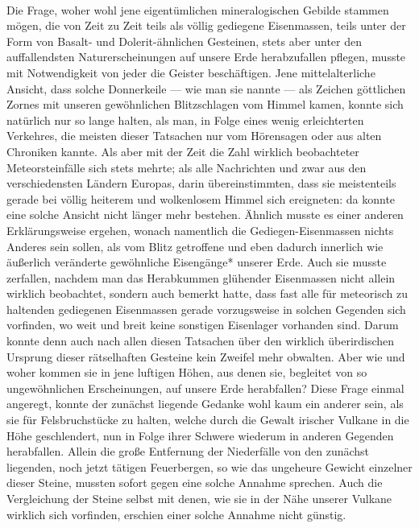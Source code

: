 \documentclass[a4paper, 8pt, oneside, polutonikogreek, german]{article}
\begin{document}
\paragraph{}
Die Frage, woher wohl jene eigentümlichen mineralogischen Gebilde stammen mögen, die von Zeit zu Zeit teils als völlig gediegene Eisenmassen, teils unter der Form von Basalt- und Dolerit-ähnlichen Gesteinen, stets aber unter den auffallendsten Naturerscheinungen auf unsere Erde herabzufallen pflegen, musste mit Notwendigkeit von jeder die Geister beschäftigen. Jene mittelalterliche Ansicht, dass solche Donnerkeile — wie man sie nannte — als Zeichen göttlichen Zornes mit unseren gewöhnlichen Blitzschlagen vom Himmel kamen, konnte sich natürlich nur so lange halten, als man, in Folge eines wenig erleichterten Verkehres, die meisten dieser Tatsachen nur vom Hörensagen oder aus alten Chroniken kannte. Als aber mit der Zeit die Zahl wirklich beobachteter Meteorsteinfälle sich stets mehrte; als alle Nachrichten und zwar aus den verschiedensten Ländern Europas, darin übereinstimmten, dass sie meistenteils gerade bei völlig heiterem und wolkenlosem Himmel sich ereigneten: da konnte eine solche Ansicht nicht länger mehr bestehen. Ähnlich musste es einer anderen Erklärungsweise ergehen, wonach namentlich die Gediegen-Eisenmassen nichts Anderes sein sollen, als vom Blitz getroffene und eben dadurch innerlich wie äußerlich veränderte gewöhnliche Eisengänge* unserer Erde. Auch sie musste zerfallen, nachdem man das Herabkummen glühender Eisenmassen nicht allein wirklich beobachtet, sondern auch bemerkt hatte, dass fast alle für meteorisch zu haltenden gediegenen Eisenmassen gerade vorzugsweise in solchen Gegenden sich vorfinden, wo weit und breit keine sonstigen Eisenlager vorhanden sind. Darum konnte denn auch nach allen diesen Tatsachen über den wirklich überirdischen Ursprung dieser rätselhaften Gesteine kein Zweifel mehr obwalten. Aber wie und woher kommen sie in jene luftigen Höhen, aus denen sie, begleitet von so ungewöhnlichen Erscheinungen, auf unsere Erde herabfallen? Diese Frage einmal angeregt, konnte der zunächst liegende Gedanke wohl kaum ein anderer sein, als sie für Felsbruchstücke zu halten, welche durch die Gewalt irischer Vulkane in die Höhe geschlendert, nun in Folge ihrer Schwere wiederum in anderen Gegenden herabfallen. Allein die große Entfernung der Niederfälle von den zunächst liegenden, noch jetzt tätigen Feuerbergen, so wie das ungeheure Gewicht einzelner dieser Steine, mussten sofort gegen eine solche Annahme sprechen. Auch die Vergleichung der Steine selbst mit denen, wie sie in der Nähe unserer Vulkane wirklich sich vorfinden, erschien einer solche Annahme nicht günstig.
\end{document}
